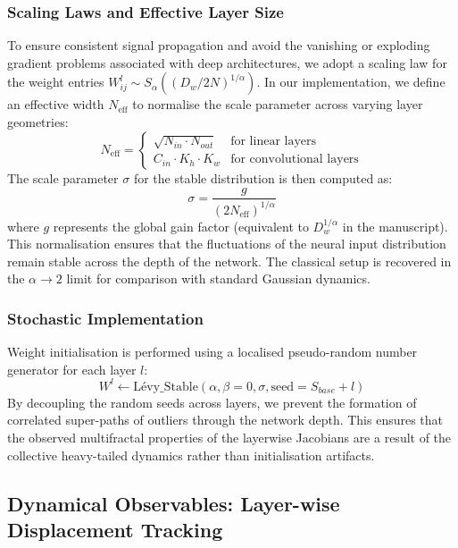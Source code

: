 \documentclass[11pt,a4paper]{article}
\begin{document}
\subsubsection{Scaling Laws and Effective Layer Size}
To ensure consistent signal propagation and avoid the vanishing or exploding gradient problems associated with deep architectures, we adopt a scaling law for the weight entries $W_{ij}^l \sim S_\alpha((D_w / 2N)^{1/\alpha})$. In our implementation, we define an effective width $N_{\text{eff}}$ to normalise the scale parameter across varying layer geometries:
\begin{equation}
    N_{\text{eff}} = 
    \begin{cases} 
      \sqrt{N_{in} \cdot N_{out}} & \text{for linear layers} \\
      C_{in} \cdot K_h \cdot K_w & \text{for convolutional layers}
    \end{cases}
\end{equation}
The scale parameter $\sigma$ for the stable distribution is then computed as:
\begin{equation}
    \sigma = \frac{g}{(2 N_{\text{eff}})^{1/\alpha}}
\end{equation}
where $g$ represents the global gain factor (equivalent to $D_w^{1/\alpha}$ in the manuscript). This normalisation ensures that the fluctuations of the neural input distribution remain stable across the depth of the network. The classical setup is recovered in the $\alpha \rightarrow 2$ limit for comparison with standard Gaussian dynamics.

\subsubsection{Stochastic Implementation}
Weight initialisation is performed using a localised pseudo-random number generator for each layer $l$:
\begin{equation}
    W^l \leftarrow \text{Lévy\_Stable}(\alpha, \beta=0, \sigma, \text{seed} = S_{base} + l)
\end{equation}
By decoupling the random seeds across layers, we prevent the formation of correlated super-paths of outliers through the network depth. This ensures that the observed multifractal properties of the layerwise Jacobians are a result of the collective heavy-tailed dynamics rather than initialisation artifacts.

\subsection{Dynamical Observables: Layer-wise Displacement Tracking}
\end{document}
